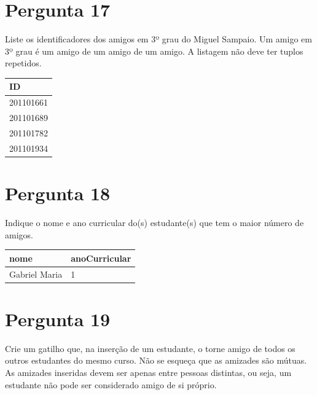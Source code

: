 \documentclass[type=normal, year=2015/16]{bdad_exam}
\begin{document}
{\section{Pergunta 17}
Liste os identificadores dos amigos em 3º grau do Miguel Sampaio. Um amigo em 3º grau é um amigo de um amigo de um amigo. A listagem não deve ter tuplos repetidos.
\begin{center} \begin{tabular}{l}
    \textbf{ID} \\ \hline
    201101661   \\
    201101689   \\
    201101782   \\
    201101934 
\end{tabular} \end{center}


\section{Pergunta 18}
Indique o nome e ano curricular do(s) estudante(s) que tem o maior número de amigos.
\begin{center} \begin{tabular}{l | l}
    \textbf{nome} & \textbf{anoCurricular} \\ \hline
    Gabriel Maria & 1
\end{tabular} \end{center}


\section{Pergunta 19}
Crie um gatilho que, na inserção de um estudante, o torne amigo de todos os outros estudantes do mesmo curso. Não se esqueça que as amizades são mútuas. As amizades inseridas devem ser apenas entre pessoas distintas, ou seja, um estudante não pode ser considerado amigo de si próprio.


}
\end{document}

